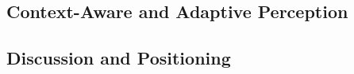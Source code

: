 \subsection{Context-Aware and Adaptive Perception}
\label{subsec:rw_adaptive}

%


\subsection{Discussion and Positioning}
\label{subsec:rw_gap}

%
